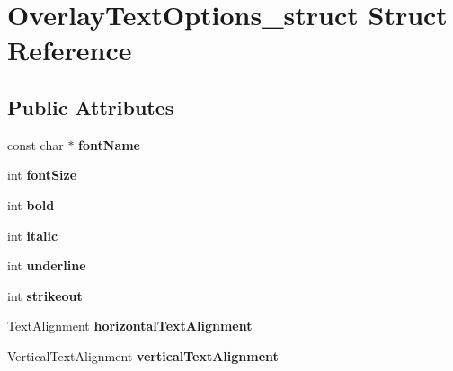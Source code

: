 \hypertarget{structOverlayTextOptions__struct}{\section{\-Overlay\-Text\-Options\-\_\-struct \-Struct \-Reference}
\label{structOverlayTextOptions__struct}
}
\subsection*{\-Public \-Attributes}
\begin{DoxyCompactItemize}
\item 
\hypertarget{structOverlayTextOptions__struct_a9d6dcf3ecce67215fe575bb2c1c87fb8}{const char $\ast$ {\bfseries font\-Name}}\label{structOverlayTextOptions__struct_a9d6dcf3ecce67215fe575bb2c1c87fb8}

\item 
\hypertarget{structOverlayTextOptions__struct_ac006ac14a3ccda0bc9308cc4fe3dac6e}{int {\bfseries font\-Size}}\label{structOverlayTextOptions__struct_ac006ac14a3ccda0bc9308cc4fe3dac6e}

\item 
\hypertarget{structOverlayTextOptions__struct_a79ec1f43d79b5c5940dc1cf4da40ec39}{int {\bfseries bold}}\label{structOverlayTextOptions__struct_a79ec1f43d79b5c5940dc1cf4da40ec39}

\item 
\hypertarget{structOverlayTextOptions__struct_abeb3b152dc8ee07513d8c72da48965e4}{int {\bfseries italic}}\label{structOverlayTextOptions__struct_abeb3b152dc8ee07513d8c72da48965e4}

\item 
\hypertarget{structOverlayTextOptions__struct_a03e72a14dcd3aafa7d9c8daa51c1c268}{int {\bfseries underline}}\label{structOverlayTextOptions__struct_a03e72a14dcd3aafa7d9c8daa51c1c268}

\item 
\hypertarget{structOverlayTextOptions__struct_a4249a3bd88817aea2c4156c8dc2b5210}{int {\bfseries strikeout}}\label{structOverlayTextOptions__struct_a4249a3bd88817aea2c4156c8dc2b5210}

\item 
\hypertarget{structOverlayTextOptions__struct_ab08fbf662761fd8786db48a6e8504444}{\-Text\-Alignment {\bfseries horizontal\-Text\-Alignment}}\label{structOverlayTextOptions__struct_ab08fbf662761fd8786db48a6e8504444}

\item 
\hypertarget{structOverlayTextOptions__struct_a45721719ea07085a51911630eb2f50dd}{\-Vertical\-Text\-Alignment {\bfseries vertical\-Text\-Alignment}}\label{structOverlayTextOptions__struct_a45721719ea07085a51911630eb2f50dd}


\end{DoxyCompactItemize}
